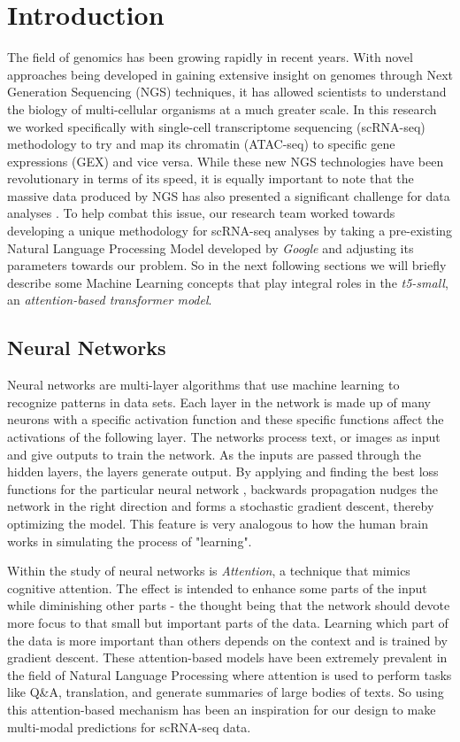 \section{Introduction}

The field of genomics has been growing rapidly in recent years. 
With novel approaches being developed in gaining extensive insight on genomes through Next Generation Sequencing (NGS) techniques, it has allowed scientists to understand the biology of multi-cellular organisms at a much greater scale. 
In this research we worked specifically with single-cell transcriptome sequencing (scRNA-seq) methodology to try and map its chromatin (ATAC-seq) to specific gene expressions (GEX) and vice versa. 
While these new NGS technologies have been revolutionary in terms of its speed, it is equally important to note that the massive data produced by NGS has also presented a significant challenge for data analyses \cite{one}. 
To help combat this issue, our research team worked towards developing a unique methodology for scRNA-seq analyses by taking a pre-existing Natural Language Processing Model developed by \emph{Google} and adjusting its parameters towards our problem. So in the next following sections we will briefly describe some Machine Learning concepts that play integral roles in the \emph{t5-small}, an \emph{attention-based transformer model}.

\subsection{Neural Networks}

Neural networks are multi-layer algorithms that use machine learning to recognize patterns in data sets. 
Each layer in the network is made up of many neurons with a specific activation function and these specific functions affect the activations of the following layer. 
The networks process text, or images as input and give outputs to train the network. 
As the inputs are passed through the hidden layers, the layers generate output. By applying and finding the best loss functions for the particular neural network \cite{two}, backwards propagation nudges the network in the right direction and forms a stochastic gradient descent, thereby optimizing the model. 
This feature is very analogous to how the human brain works in simulating the process of "learning".

Within the study of neural networks is \emph{Attention}, a technique that mimics cognitive attention. 
The effect is intended to enhance some parts of the input while diminishing other parts - the thought being that the network should devote more focus to that small but important parts of the data. 
Learning which part of the data is more important than others depends on the context and is trained by gradient descent. 
These attention-based models have been extremely prevalent in the field of Natural Language Processing where attention is used to perform tasks like Q\&A, translation, and generate summaries of large bodies of texts. So using this attention-based mechanism has been an inspiration for our design to make multi-modal predictions for scRNA-seq data.

